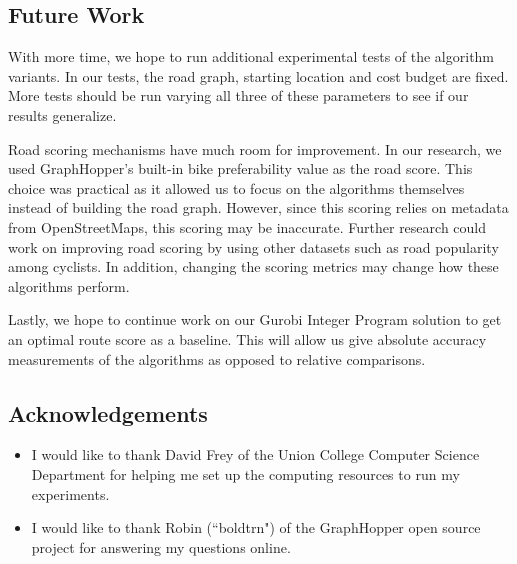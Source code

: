 \documentclass[11pt]{article}
\begin{document}
\subsection{Future Work}
With more time, we hope to run additional experimental tests of the algorithm variants. In our tests, the road graph, starting location and cost budget are fixed. More tests should be run varying all three of these parameters to see if our results generalize.  

Road scoring mechanisms have much room for improvement. In our research, we used GraphHopper's built-in bike preferability value as the road score. This choice was practical as it allowed us to focus on the algorithms themselves instead of building the road graph. However, since this scoring relies on metadata from OpenStreetMaps, this scoring may be inaccurate. Further research could work on improving road scoring by using other datasets such as road popularity among cyclists. In addition, changing the scoring metrics may change how these algorithms perform.

Lastly, we hope to continue work on our Gurobi Integer Program solution to get an optimal route score as a baseline. This will allow us give absolute accuracy measurements of the algorithms as opposed to relative comparisons.

\subsection{Acknowledgements}
\begin{itemize}
    \item I would like to thank David Frey of the Union College Computer Science Department for helping me set up the computing resources to run my experiments.
    \item I would like to thank Robin (``boldtrn") of the GraphHopper open source project for answering my questions online.   
\end{itemize}


\appendix
\end{document}
